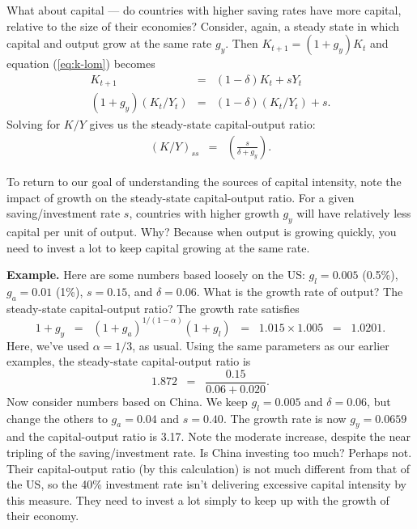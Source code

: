 What about capital --- do countries with higher saving rates have more
capital, relative to the size of their economies?
Consider, again, a steady state in which capital and output grow
at the same rate $g_y$.
Then $K_{t+1} = (1+g_y) K_t$ and equation (\ref{eq:k-lom}) becomes
\begin{eqnarray*}
    K_{t+1}  &=& (1-\delta) K_t + s Y_t  \\
    (1+g_y) (K_{t}/Y_{t}) &=& (1-\delta) (K_t/Y_t) + s .
\end{eqnarray*}
Solving for $K/Y$ gives us the steady-state capital-output ratio:
\begin{eqnarray*}
    (K/Y)_{ss} &=& \left( \frac{s}{\delta+g_y} \right) .
\end{eqnarray*}

To return to our goal of understanding the sources of capital intensity,
note the impact of growth on the steady-state capital-output ratio.
For a given saving/investment rate $s$, countries with higher growth $g_y$
will have relatively less capital per unit of output.
Why?  Because when output is growing quickly,
you need to invest a lot to keep capital growing at the same rate.


\textbf{Example.}
Here are some numbers based loosely on the US:
$ g_l = 0.005 $ (0.5\%), $ g_a = 0.01 $ (1\%), $s=0.15$,
and $\delta = 0.06$.
What is the growth rate of output?
The steady-state capital-output ratio?
The growth rate satisfies
\[
    1+g_y \;\;=\;\; (1+g_a)^{1/(1-\alpha)} (1+g_l) \;\;=\;\; 1.015 \times 1.005
        \;\;=\;\; 1.0201.
\]
Here, we've used $\alpha = 1/3$, as usual.
Using the same parameters as our earlier examples, the steady-state
capital-output ratio is
\[
    1.872 \;\;=\;\; \frac{0.15}{0.06 + 0.020} .
\]
Now consider numbers based on China.
We keep $ g_l = 0.005 $ and $\delta = 0.06$,
but change the others to $ g_a = 0.04 $ and $s = 0.40 $.
The growth rate is now $g_y = 0.0659$ and the capital-output ratio
is 3.17. Note the moderate increase, despite the near tripling of the
saving/investment rate. Is China investing too much?
Perhaps not. Their capital-output ratio (by this calculation)
is not much different from that of the US, so the 40\% investment
rate isn't delivering excessive capital intensity by this measure.
They need to invest a lot simply to keep up with the growth
of their economy.



